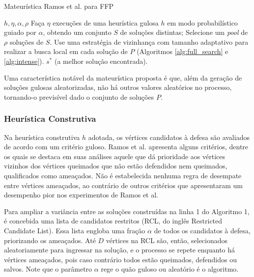 \documentclass{MO824}
\begin{document}
    \begin{algorithm}[H]
    \caption{Mateurística Ramos et al. para FFP}
    \label{alg:matheuristic}
    \begin{algorithmic}[1]
        \REQUIRE $h,\eta,\alpha,\rho$
        \STATE Faça $\eta$ execuções de uma heurística gulosa $h$ em modo probabilístico guiado por $\alpha$, obtendo um conjunto $S$ de soluções distintas;
        \STATE Selecione um \textit{pool} de $\rho$ soluções de $S$.
        \STATE Use uma estratégia de vizinhança com tamanho adaptativo para realizar a busca local em cada solução de $P$ (Algoritmos \ref{alg:full_search} e \ref{alg:intense}).
        \RETURN $s^*$ (a melhor solução encontrada).
    \end{algorithmic}
    \end{algorithm}
    
    Uma característica notável da mateurística proposta é que, além da geração de soluções gulosas aleatorizadas, não há outros valores aleatórios no processo, tornando-o previsível dado o conjunto de soluções $P$.
    
    \subsubsection{Heurística Construtiva} \label{heuristic}
    
    Na heurística construtiva $h$ adotada, os vértices candidatos à defesa são avaliados de acordo com um critério guloso. Ramos et al. \cite{natanael} apresenta alguns critérios, dentre os quais se destaca em suas análises aquele que dá prioridade aos vértices vizinhos dos vértices queimados que não estão defendidos nem queimados, qualificados como ameaçados. Não é estabelecida nenhuma regra de desempate entre vértices ameaçados, ao contrário de outros critérios que apresentaram um desempenho pior nos experimentos de Ramos et al. \cite{natanael}
    
    Para ampliar a variância entre as soluções construídas na linha 1 do Algoritmo 1, é concebida uma lista de candidatos restritos (RCL, do inglês Restricted Candidate List). Essa lista engloba uma fração $\alpha$ de todos os candidatos à defesa, priorizando os ameaçados. Até $D$ vértices na RCL são, então, selecionados aleatoriamente para ingressar na solução, e o processo se repete enquanto há vértices ameaçados, pois caso contrário todos estão queimados, defendidos ou salvos. Note que o parâmetro $\alpha$ rege o quão guloso ou aleatório é o algoritmo.
    
\end{document}
